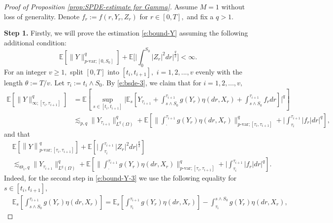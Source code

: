\documentclass[11pt,reqno]{amsart}
\def\E{\mathbb E}
\numberwithin{equation}{section}
\begin{document}
\begin{proof}[Proof of Proposition \ref{prop:SPDE-estimate for Gamma}]
Assume $M=1$ without loss of generality. Denote $f_{r} := f(r,Y_{r},Z_{r})$ for $r\in[0,T],$ and fix a $q>1.$

{\bf Step 1.} Firstly, we will prove the estimation \eqref{e:bound-Y} assuming the following additional condition:
\begin{equation}\label{e:addition-con}
\E\left[\|Y\|^{q}_{p\text{-var};[0,S_{0}]}\right] + \mathbb{E}\bigg[\Big|\int_{0}^{S_{0}}|Z_{r}|^{2}dr\Big|^{\frac{q}{2}}\bigg] <\infty.
\end{equation}
For an integer $v\ge 1,$ split $[0,T]$ into $[t_{i},t_{i+1}],$ $i=1,2,...,v$ evenly with the length $\theta := T/v.$ Let $\tau_{i} := t_{i}\land S_{0	}.$ By \eqref{e:bsde-3}, we claim that for $i=1,2,...,v,$
\begin{align}\label{e:bound-Y-3}
\mathbb{E}\left[\|Y\|^{q}_{\infty;[\tau_{i},\tau_{i+1}]}\right]
&= \mathbb{E}\left[\sup_{s\in[t_{i},t_{i+1}]}\bigg|\mathbb{E}_{s}\left[Y_{\tau_{i+1}} + \int_{s\land S_0}^{\tau_{i+1}}g(Y_{r})\eta(dr,X_{r}) + \int_{s\land S_0}^{\tau_{i+1}}f_{r}dr\right]\bigg|^{q}\right]\\\nonumber
&\lesssim_{p,q} \|Y_{\tau_{i+1}}\|^{q}_{L^{q}(\Omega)} +  \mathbb{E}\left[\Big\|\int_{\cdot}^{\tau_{i+1}}g(Y_{r})\eta(dr,X_{r})\Big\|^{q}_{p\text{-var};[\tau_{i},\tau_{i+1}]} + \Big|\int_{\tau_{i}}^{\tau_{i+1}}|f_{r}|dr\Big|^{q}\right],
\end{align}
and that
\begin{equation}\label{e:h_p,q bound}
\begin{aligned}
&\mathbb{E}\left[\left\|Y\right\|^{q}_{p\text{-var};[\tau_{i},\tau_{i+1}]}\right] + \mathbb{E}\left[\Big|\int_{\tau_{i}}^{\tau_{i+1}}|Z_{r}|^{2}dr\Big|^{\frac{q}{2}}\right]\\
&\lesssim_{\Theta_{1},q} \|Y_{\tau_{i+1}}\|^{q}_{L^{q}(\Omega)} + \mathbb{E}\left[\Big\|\int_{\cdot}^{\tau_{i+1}}g(Y_r)\eta(dr,X_r)\Big\|_{p\text{-var};[\tau_{i},\tau_{i+1}]}^{q}  + \Big|\int_{\tau_{i}}^{\tau_{i+1}}|f_{r}|dr\Big|^{q}\right].
\end{aligned}
\end{equation}
Indeed, for the second step in \eqref{e:bound-Y-3} we use the following equality for $s\in[t_i, t_{i+1}]$,  \begin{equation}\label{e:E[int g d eta]}
\begin{aligned}
&\mathbb{E}_{s}\left[\int_{s\land S_0}^{\tau_{i+1}}g(Y_r)\eta(dr,X_r)\right] = \mathbb{E}_{s}\left[\int_{\tau_{i}}^{\tau_{i+1}}g(Y_r)\eta(dr,X_r)\right]  - \int_{\tau_{i}}^{s\land S_0}g(Y_r)\eta(dr,X_r),

\end{aligned}
\end{equation}
\end{proof}
\end{document}
